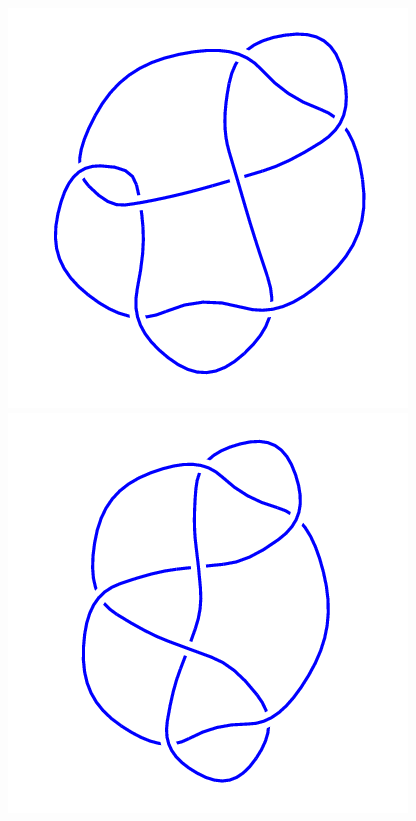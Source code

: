 \begin{figure}[H]
\begin{minipage}[b]{.18\linewidth}
	\end{minipage}
	\begin{minipage}[b]{.18\linewidth}
		\centering
		\includegraphics[width=\linewidth]{../data/7_6.png}
	\end{minipage}
	\begin{minipage}[b]{.18\linewidth}
		\centering
		\includegraphics[width=\linewidth]{../data/7_7.png}

\end{minipage}
\end{figure}
